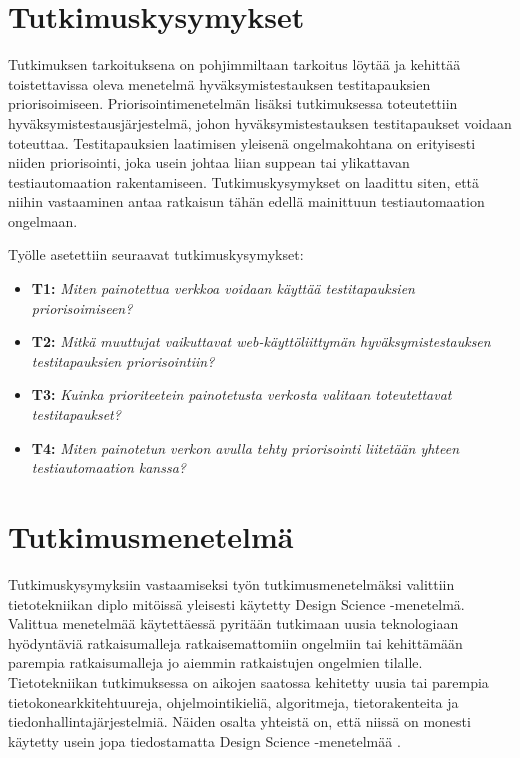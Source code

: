 \section{Tutkimuskysymykset} \label{ch:06_tutkimuskysymykset}

  Tutkimuksen tarkoituksena on pohjimmiltaan tarkoitus löytää ja kehittää toistettavissa oleva menetelmä hyväksymistestauksen testitapauksien priorisoimiseen.
  Priorisointimenetelmän lisäksi tutkimuksessa toteutettiin hyväksymistestausjärjestelmä, johon hyväksymistestauksen testitapaukset voidaan toteuttaa.
  Testitapauksien laatimisen yleisenä ongelmakohtana on erityisesti niiden priorisointi, joka usein johtaa liian suppean tai ylikattavan testiautomaation rakentamiseen.
  Tutkimuskysymykset on laadittu siten, että niihin vastaaminen antaa ratkaisun tähän edellä mainittuun testiautomaation ongelmaan.

  Työlle asetettiin seuraavat tutkimuskysymykset:

  \begin{itemize}
    \item \textbf{T1:} \emph{Miten painotettua verkkoa voidaan käyttää testitapauksien priorisoimiseen?}
    \item \textbf{T2:} \emph{Mitkä muuttujat vaikuttavat web-käyttöliittymän hyväksymistestauksen testitapauksien priorisointiin?}
    \item \textbf{T3:} \emph{Kuinka prioriteetein painotetusta verkosta valitaan toteutettavat testitapaukset?}
    \item \textbf{T4:} \emph{Miten painotetun verkon avulla tehty priorisointi liitetään yhteen testiautomaation kanssa?}
  \end{itemize}

  \section{Tutkimusmenetelmä} \label{ch:06_tutkimusmenetelma}

  Tut\-ki\-mus\-ky\-sy\-myk\-siin vastaamiseksi työn tut\-ki\-mus\-me\-ne\-tel\-mäk\-si valittiin tie\-to\-tek\-nii\-kan dip\-lo\- mi\-töis\-sä  yleisesti käytetty Design Science -menetelmä.
  Valittua menetelmää käytettäessä pyritään tutkimaan uusia teknologiaan hyödyntäviä ratkaisumalleja ratkaisemattomiin ongelmiin tai kehittämään parempia ratkaisumalleja jo aiemmin ratkaistujen ongelmien tilalle.
  Tietotekniikan tutkimuksessa on aikojen saatossa kehitetty uusia tai parempia tietokonearkkitehtuureja, ohjelmointikieliä, algoritmeja, tietorakenteita ja tiedonhallintajärjestelmiä.
  Näiden osalta yhteistä on, että niissä on monesti käytetty usein jopa tiedostamatta Design Science -menetelmää \parencite{design_science_history}.

